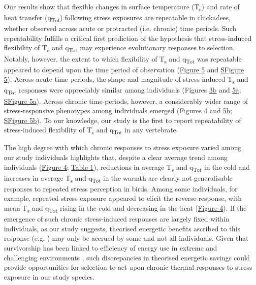 \documentclass[12pt]{article}
\begin{document}
\noindent Our results show that flexible changes in surface temperature (T\textsubscript{s}) and rate of heat transfer (q\textsubscript{Tot}) following stress exposures are repeatable in chickadees, whether observed across acute or protracted (i.e. chronic) time periods. Such repeatability fulfills a critical first prediction of the hypothesis that stress-induced flexibility of T\textsubscript{s} and q\textsubscript{Tot} may experience evolutionary responses to selection. Notably, however, the extent to which flexibility of T\textsubscript{s} and q\textsubscript{Tot} was repeatable appeared to depend upon the time period of observation (\hyperref[Fig4.5]{Figure 5} and \hyperref[FigC.5]{SFigure 5}). Across acute time periods, the shape and magnitude of stress-induced T\textsubscript{s} and q\textsubscript{Tot} responses were appreciably similar among individuals (Figures \hyperref[Fig4.3]{3b} and \hyperref[Fig4.5]{5a}; \hyperref[FigC.5]{SFigure 5a}). Across chronic time-periods, however, a considerably wider range of stress-responsive phenotypes among individuals emerged (Figures \hyperref[Fig4.4]{4} and \hyperref[Fig4.5]{5b}; \hyperref[FigC.5]{SFigure 5b}). To our knowledge, our study is the first to report repeatability of stress-induced flexibility of T\textsubscript{s} and q\textsubscript{Tot} in any vertebrate. \vspace{1cm}

\noindent The high degree with which chronic responses to stress exposure varied among our study individuals highlights that, despite a clear average trend among individuals (\hyperref[Fig4.4]{Figure 4}; \hyperref[Tab4.1]{Table 1}), reductions in average T\textsubscript{s} and q\textsubscript{Tot} in the cold and increases in average T\textsubscript{s} and q\textsubscript{Tot} in the warmth are clearly not generalisable responses to repeated stress perception in birds. Among some individuals, for example, repeated stress exposure appeared to elicit the reverse response, with mean T\textsubscript{s} and q\textsubscript{Tot} rising in the cold and decreasing in the heat (\hyperref[Fig4.4]{Figure 4}). If the emergence of such chronic stress-induced responses are largely fixed within individuals, as our study suggests, theorised energetic benefits ascribed to this response (e.g. \citealt{robertson_2020b}) may only be accrued by some and not all individuals. Given that survivorship has been linked to efficiency of energy use in extreme and challenging environments \citep{parsons_2005}, such discrepancies in theorised energetic savings could provide opportunities for selection to act upon chronic thermal responses to stress exposure in our study species. \vspace{1cm}
\end{document}

